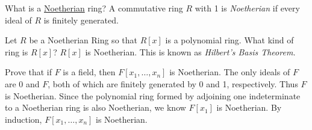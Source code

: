 \documentclass[avery5371,grid]{flashcards}
\begin{document}
\begin{flashcard}[Rings]{What is a \underline{Noetherian} ring?}
 A commutative ring $R$ with 1 is \emph{Noetherian} if every ideal of $R$ is finitely generated.
\end{flashcard}

\begin{flashcard}[Rings]{Let $R$ be a Noetherian Ring so that $R[x]$ is a polynomial ring. What kind of ring is $R[x]$?}
 $R[x]$ is Noetherian. This is known as \emph{Hilbert's Basis Theorem.}
\end{flashcard}

\begin{flashcard}[Rings]{Prove that if $F$ is a field, then $F[x_1, \ldots, x_n]$ is Noetherian.}
 The only ideals of $F$ are 0 and $F$, both of which are finitely generated by 0 and 1, respectively. Thus $F$ is Noetherian. Since the polynomial ring formed by adjoining one indeterminate to a Noetherian ring is also Noetherian, we know $F[x_1]$ is Noetherian. By induction, $F[x_1, \ldots, x_n]$ is Noetherian.
\end{flashcard}


\end{document}
